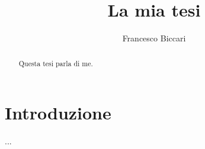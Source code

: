 \documentclass[binding=0.6cm]{sapthesis}
\title{La mia tesi}
\author{Francesco Biccari}
\begin{document}
\frontmatter
\maketitle
\dedication{Dedicato a\\ Donald Knuth}
\begin{abstract}
Questa tesi parla di me.
\end{abstract}
\tableofcontents
\mainmatter
\chapter{Introduzione}
...
\backmatter
\cleardoublepage
{} %
\end{document}
